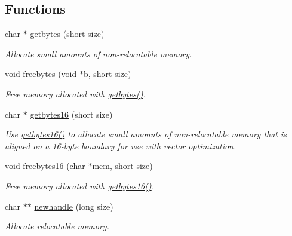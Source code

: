 \subsection*{Functions}
\begin{DoxyCompactItemize}
\item 
char $\ast$ \hyperlink{group__memory_gaa513b95a076519ec168b62d85881f643}{getbytes} (short size)
\begin{DoxyCompactList}\small\item\em Allocate small amounts of non-\/relocatable memory. \item\end{DoxyCompactList}\item 
void \hyperlink{group__memory_gaa1dc485c42515917ca377dbaf15b7dcd}{freebytes} (void $\ast$b, short size)
\begin{DoxyCompactList}\small\item\em Free memory allocated with \hyperlink{group__memory_gaa513b95a076519ec168b62d85881f643}{getbytes()}. \item\end{DoxyCompactList}\item 
char $\ast$ \hyperlink{group__memory_ga198147e2629edde67218d8a759e9d5a0}{getbytes16} (short size)
\begin{DoxyCompactList}\small\item\em Use \hyperlink{group__memory_ga198147e2629edde67218d8a759e9d5a0}{getbytes16()} to allocate small amounts of non-\/relocatable memory that is aligned on a 16-\/byte boundary for use with vector optimization. \item\end{DoxyCompactList}\item 
void \hyperlink{group__memory_gafba42d2b23405e29469392394cf41555}{freebytes16} (char $\ast$mem, short size)
\begin{DoxyCompactList}\small\item\em Free memory allocated with \hyperlink{group__memory_ga198147e2629edde67218d8a759e9d5a0}{getbytes16()}. \item\end{DoxyCompactList}\item 
char $\ast$$\ast$ \hyperlink{group__memory_ga50135e5f9bb18030ff1d12e9976253ab}{newhandle} (long size)
\begin{DoxyCompactList}\small\item\em Allocate relocatable memory. \item\end{DoxyCompactList}\item 
$$
\end{DoxyCompactItemize}
